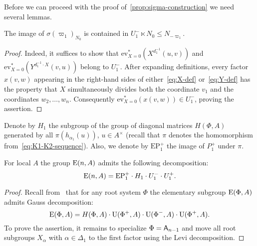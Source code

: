Before we can proceed with the proof of~\cref{prop:sigma-construction} we need several lemmas.
\begin{lemma}\label{lem:sigma-N0-image}
    The image of $\sigma(\varpi_1)_{N_0}$ is contained in $U_1^- \ltimes N_0 \leq N_{-\varpi_1}$.
\end{lemma}
\begin{proof}
Indeed, it suffices to show that $\mathrm{ev}_{X=0}^*(X^{d_1^{-1}}(u, v))$ and $\mathrm{ev}_{X=0}^*(Y^{d^{-1}_1 \cdot X}(v, u))$ belong to $U_1^-$.
After expanding definitions, every factor $x(v, w)$ appearing in the right-hand sides of either~\eqref{eq:X-def} or~\eqref{eq:Y-def}
 has the property that $X$ simultaneously divides both the coordinate $v_1$ and the coordinates $w_2, \ldots, w_n$.
Consequently $\mathrm{ev}_{X=0}^* \left(x(v, w)\right) \in U_1^-$, proving the assertion.
\end{proof}

Denote by $H_{1}$ the subgroup of the group of diagonal matrices $H(\Phi, A)$ generated by all $\pi(h_{\alpha_1}(u))$, $u \in A^\times$
(recall that $\pi$ denotes the homomorphism from~\eqref{eq:K1-K2-sequence}).
Also, we denote by $\mathrm{EP}_1^+$ the image of $P_1^+$ under $\pi$.
\begin{lemma} \label{lem:cor-Gauss}
For local $A$ the group $\operatorname{E}(n, A)$ admits the following decomposition:
 \[\operatorname{E}(n, A) = \mathrm{EP}_1^+ \cdot H_{1} \cdot U^-_1 \cdot U^+_1. \]
\end{lemma}
\begin{proof}
    Recall from~\cite[Theorem~1.1]{Sm12} that for any root system $\Phi$ the elementary subgroup $\operatorname{E}(\Phi, A)$ admits Gauss decomposition:
    \[ \operatorname{E}(\Phi, A) = H(\Phi, A) \cdot \operatorname{U}(\Phi^+, A) \cdot \operatorname{U}(\Phi^-, A) \cdot \operatorname{U}(\Phi^+, A). \]
    To prove the assertion, it remains to specialize $\Phi = \mathsf{A}_{n-1}$ and move all root subgroups
     $X_\alpha$ with $\alpha \in \Delta_1$ to the first factor using the Levi decomposition.
\end{proof}

